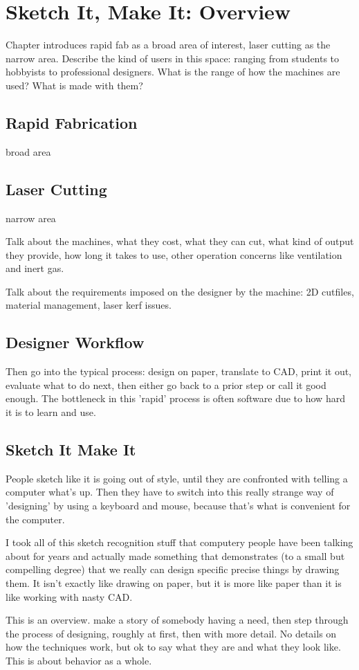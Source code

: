 \chapter{Sketch It, Make It: Overview}

Chapter introduces rapid fab as a broad area of interest, laser
cutting as the narrow area. Describe the kind of users in this space:
ranging from students to hobbyists to professional designers. What is
the range of how the machines are used? What is made with them?


\section{Rapid Fabrication}

broad area

\section{Laser Cutting}

narrow area

Talk about the machines, what they cost, what they can cut, what kind
of output they provide, how long it takes to use, other operation
concerns like ventilation and inert gas.

Talk about the requirements imposed on the designer by the machine: 2D
cutfiles, material management, laser kerf issues. 

\section{Designer Workflow}

Then go into the typical process: design on paper, translate to CAD,
print it out, evaluate what to do next, then either go back to a prior
step or call it good enough. The bottleneck in this 'rapid' process is
often software due to how hard it is to learn and use.


\section{Sketch It Make It} 

People sketch like it is going out of style, until they are confronted
with telling a computer what's up. Then they have to switch into this
really strange way of 'designing' by using a keyboard and mouse,
because that's what is convenient for the computer.

I took all of this sketch recognition stuff that computery people have
been talking about for years and actually made something that
demonstrates (to a small but compelling degree) that we really can
design specific precise things by drawing them. It isn't exactly like
drawing on paper, but it is more like paper than it is like working
with nasty CAD.

This is an overview. make a story of somebody having a need, then step
through the process of designing, roughly at first, then with more
detail. No details on how the techniques work, but ok to say what they
are and what they look like. This is about behavior as a whole.


